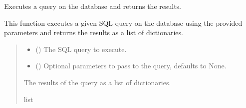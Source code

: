 \documentclass[letterpaper,10pt,english]{sphinxmanual}
\begin{document}
\begin{fulllineitems}
\label{\detokenize{my_fastapi:my_fastapi.main.query_db}}
\pysigstartsignatures
\pysiglinewithargsret
{}
{\sphinxparamcomma {}}
{}
\pysigstopsignatures
\sphinxAtStartPar
Executes a query on the database and returns the results.

\sphinxAtStartPar
This function executes a given SQL query on the database using the provided parameters
and returns the results as a list of dictionaries.
\begin{quote}\begin{description}
\begin{itemize}
\item {} 
\sphinxAtStartPar
{} () \textendash{} The SQL query to execute.

\item {} 
\sphinxAtStartPar
{} (\sphinxstyleliteralemphasis{\sphinxupquote{{[}}}\sphinxstyleliteralemphasis{\sphinxupquote{{]}}}) \textendash{} Optional parameters to pass to the query, defaults to None.

\end{itemize}

\sphinxAtStartPar
The results of the query as a list of dictionaries.

\sphinxAtStartPar
list

\end{description}\end{quote}

\end{fulllineitems}

\end{document}
